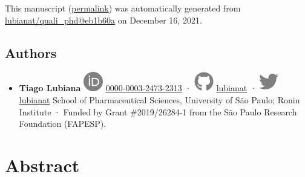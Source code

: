 This manuscript
(\href{https://lubianat.github.io/quali_phd/v/eb1b60a057886c60a568ad9586443de700dd0c32/}{permalink})
was automatically generated
from \href{https://github.com/lubianat/quali_phd/tree/eb1b60a057886c60a568ad9586443de700dd0c32}{lubianat/quali\_phd@eb1b60a}
on December 16, 2021.

\hypertarget{authors}{%
\subsection{Authors}\label{authors}}

\begin{itemize}
\tightlist
\item
  \textbf{Tiago Lubiana}
  \includegraphics{images/orcid.svg}
  \href{https://orcid.org/0000-0003-2473-2313}{0000-0003-2473-2313}
  · \includegraphics{images/github.svg}
  \href{https://github.com/lubianat}{lubianat}
  · \includegraphics{images/twitter.svg}
  \href{https://twitter.com/lubianat}{lubianat}
  School of Pharmaceutical Sciences, University of São Paulo; Ronin Institute
  · Funded by Grant \#2019/26284-1 from the São Paulo Research Foundation (FAPESP).
\end{itemize}

\hypertarget{abstract}{%
\section{Abstract}\label{abstract}}

